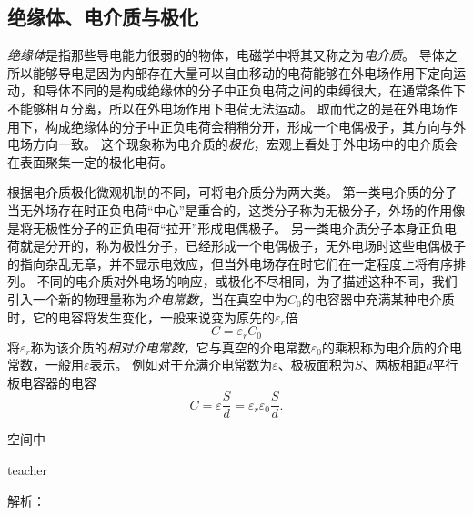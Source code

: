 \subsection{绝缘体、电介质与极化}

\emph{绝缘体}是指那些导电能力很弱的的物体，电磁学中将其又称之为\emph{电介质}。
导体之所以能够导电是因为内部存在大量可以自由移动的电荷能够在外电场作用下定向运动，和导体不同的是构成绝缘体的分子中正负电荷之间的束缚很大，在通常条件下不能够相互分离，所以在外电场作用下电荷无法运动。
取而代之的是在外电场作用下，构成绝缘体的分子中正负电荷会稍稍分开，形成一个电偶极子，其方向与外电场方向一致。
这个现象称为电介质的\emph{极化}，宏观上看处于外电场中的电介质会在表面聚集一定的极化电荷。

根据电介质极化微观机制的不同，可将电介质分为两大类。
第一类电介质的分子当无外场存在时正负电荷“中心”是重合的，这类分子称为无极分子，外场的作用像是将无极性分子的正负电荷“拉开”形成电偶极子。
另一类电介质分子本身正负电荷就是分开的，称为极性分子，已经形成一个电偶极子，无外电场时这些电偶极子的指向杂乱无章，并不显示电效应，但当外电场存在时它们在一定程度上将有序排列。
不同的电介质对外电场的响应，或极化不尽相同，为了描述这种不同，我们引入一个新的物理量称为\emph{介电常数}，当在真空中为$C_0$的电容器中充满某种电介质时，它的电容将发生变化，一般来说变为原先的$\varepsilon_r$倍
\begin{equation}
C = \varepsilon_r C_0
\end{equation}
将$\varepsilon_r$称为该介质的\emph{相对介电常数}，它与真空的介电常数$\varepsilon_0$的乘积称为电介质的介电常数，一般用$\varepsilon$表示。
例如对于充满介电常数为$\varepsilon$、极板面积为$S$、两板相距$d$平行板电容器的电容
\begin{equation}
C = \varepsilon\frac{S}{d} = \varepsilon_r\varepsilon_0\frac{S}{d}.
\end{equation}


\begin{example}
空间中

\begin{taggedblock}{teacher}

解析：
\end{taggedblock}
\end{example}

